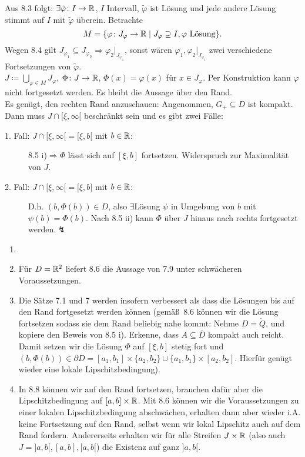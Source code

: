 \begin{beweis}
	Aus 8.3 folgt: $ \exists\tilde\varphi\colon I\rightarrow\mathbb{R} $, $ I $ Intervall, $ \tilde{\varphi} $ ist L\"osung und jede andere L\"osung stimmt auf $ I $ mit $ \tilde{\varphi} $ \"uberein. Betrachte
	\[ M=\lbrace\varphi\colon J_\varphi\rightarrow\mathbb{R}\mid J_\varphi\supseteq I,\varphi\text{ L\"osung}\rbrace. \]
	Wegen 8.4 gilt $ J_{\varphi_1}\subseteq J_{\varphi_2}\Rightarrow \varphi_2|_{J_{\varphi_1}} $, sonst w\"aren $ \varphi_1,\varphi_2|_{J_{\varphi_1}} $ zwei verschiedene Fortsetzungen von $ \tilde{\varphi} $.\\
	$ J\coloneqq\bigcup_{\varphi\in M}J_\varphi $, $ \Phi\colon J\rightarrow\mathbb{R} $, $ \Phi(x)=\varphi(x) $ f\"ur $ x\in J_\varphi $. Per Konstruktion kann $ \varphi $ nicht fortgesetzt werden. Es bleibt die Aussage \"uber den Rand.\\
	Es gen\"ugt, den rechten Rand anzuschauen: Angenommen, $ G_+\subseteq D $ ist kompakt. Dann muss $ J\cap[\xi,\infty[ $ beschr\"ankt sein und es gibt zwei F\"alle:
	\begin{description}
		\item[1. Fall: $ J\cap [\xi,\infty[=[\xi,b[ $ mit $ b\in\mathbb{R} $:] 8.5 i)$ \Rightarrow \Phi$ l\"asst sich auf $ [\xi,b] $ fortsetzen. Widerspruch zur Maximalit\"at von $ J $.
		\item[2. Fall: $ J\cap[\xi,\infty\lbrack=\lbrack\xi, b\rbrack $ mit $ b\in\mathbb{R} $:] D.h. $ (b,\Phi(b))\in D $, also $ \exists $L\"osung $ \psi $ in Umgebung von $ b $ mit $ \psi(b)=\Phi(b) $. Nach 8.5 ii) kann $ \Phi $ \"uber $ J $ hinaus nach rechts fortgesetzt werden.$ \lightning $
	\end{description}
\end{beweis}
\begin{bemerkung}
	\begin{enumerate}
		\item[]
		\item F\"ur $ D=\mathbb{R}^2 $ liefert 8.6 die Aussage von 7.9 unter schw\"acheren Voraussetzungen.
		\item Die S\"atze 7.1 und 7 werden insofern verbessert als dass die L\"osungen bis auf den Rand fortgesetzt werden k\"onnen (gem\"a\ss\ 8.6 k\"onnen wir die L\"osung fortsetzen sodass sie dem Rand beliebig nahe kommt: Nehme $ D=\mathring Q $, und kopiere den Beweis von 8.5 i). Erkenne, dass $ A\subseteq\bar D $ kompakt auch reicht. Damit setzen wir die L\"osung $ \Phi $ auf $ [\xi,b] $ stetig fort und $ (b,\Phi(b))\in\partial D=[a_1,b_1]\times\lbrace a_2,b_2\rbrace\cup\lbrace a_1,b_1\rbrace\times[a_2,b_2] $. Hierf\"ur gen\"ugt wieder eine lokale Lipschitzbedingung).
		\item In 8.8 k\"onnen wir auf den Rand fortsetzen, brauchen daf\"ur aber die Lipschitzbedingung auf $ [a,b]\times\mathbb{R} $. Mit 8.6 k\"onnen wir die Voraussetzungen zu einer lokalen Lipschitzbedingung abschw\"achen, erhalten dann aber wieder i.A. keine Fortsetzung auf den Rand, selbst wenn wir lokal Lipschitz auch auf dem Rand fordern. Andererseits erhalten wir f\"ur alle Streifen $ J\times\mathbb{R} $ (also auch $ J=]a,b[,[a,b], [a,b[ $) die Existenz auf ganz $ ]a,b[ $.
    \end{enumerate}
\end{bemerkung}